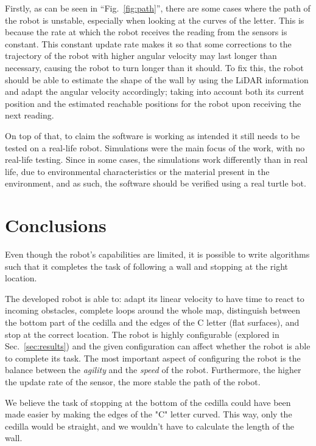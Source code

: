 \documentclass[conference]{IEEEtran}
\begin{document}
Firstly, as can be seen in ``Fig.~\ref{fig:path}'', there are some cases where the path of the robot is unstable, especially when looking at the curves of the letter. This is because the rate at which the robot receives the reading from the sensors is constant. This constant update rate makes it so that some corrections to the trajectory of the robot with higher angular velocity may last longer than necessary, causing the robot to turn longer than it should. To fix this, the robot should be able to estimate the shape of the wall by using the LiDAR information and adapt the angular velocity accordingly; taking into account both its current position and the estimated reachable positions for the robot upon receiving the next reading.    

On top of that, to claim the software is working as intended it still needs to be tested on a real-life robot. Simulations were the main focus of the work, with no real-life testing. Since in some cases, the simulations work differently than in real life, due to environmental characteristics or the material present in the environment, and as such, the software should be verified using a real turtle bot.

\section{Conclusions}

Even though the robot's capabilities are limited, it is possible to write algorithms such that it completes the task of following a wall and stopping at the right location.

The developed robot is able to: adapt its linear velocity to have time to react to incoming obstacles, complete loops around the whole map, distinguish between the bottom part of the cedilla and the edges of the C letter (flat surfaces), and stop at the correct location. The robot is highly configurable (explored in Sec.~\ref{sec:results}) and the given configuration can affect whether the robot is able to complete its task. The most important aspect of configuring the robot is the balance between the \textit{agility} and the \textit{speed} of the robot. Furthermore, the higher the update rate of the sensor, the more stable the path of the robot.

We believe the task of stopping at the bottom of the cedilla could have been made easier by making the edges of the "C" letter curved. This way, only the cedilla would be straight, and we wouldn't have to calculate the length of the wall.



\end{document}
